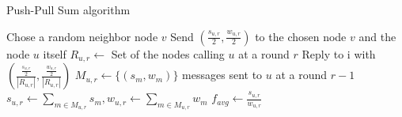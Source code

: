 \renewcommand{\algorithmicrequire}{\textbf{Input:}}
\renewcommand{\algorithmicensure}{\textbf{Output:}}
\begin{algorithm}[]
\caption{Push-Pull Sum algorithm}\label{alg:PPS}
\begin{algorithmic}[1]
\State Chose a random neighbor node $v$
\State Send $(\frac{s_{u,r}}{2}, \frac{w_{u,r}}{2})$ to the chosen node $v$ and the node $u$ itself
\EndProcedure
{}
\State $R_{u,r} \leftarrow$ Set of the nodes calling $u$ at a round $r$
\State Reply to i with $\left( \frac{\frac{s_{u,r}}{2}}{|R_{u,r}|}, \frac{\frac{w_{u,r}}{2}}{|R_{u,r}|} \right)$
\EndFor
\EndProcedure
{}
\State $M_{u,r} \leftarrow \{(s_{m}, w_{m})\}$ messages sent to $u$ at a round $r-1$
\State $s_{u,r} \leftarrow \sum_{m \in M_{u,r}}^{}s_{m}, w_{u,r} \leftarrow\sum_{m \in M_{u,r}}^{}w_{m}$
\State $f_{avg} \leftarrow \frac{s_{u,r}}{w_{u,r}}$
\EndProcedure
\end{algorithmic}
\end{algorithm}
